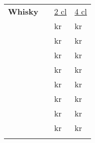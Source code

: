 \documentclass[12pt, twoside]{article}
\newcommand*\fontstyle[1]{%
  {\fontsize{15}{20}\sffamily{#1}}
}
\newcommand*\pricestyle[1]{%
  {\fontsize{14}{20}\normalfont#1}
}
\newcommand*\ColText[1]{\textcolor{Goldenrod3}{#1}}
\newenvironment{whiskySection}[1]
  {
    \pagebreak[3]\noindent\begin{longtable}{p{0.3cm}p{10cm}p{1.5cm}p{1.5cm}}
    {\endfirsthead\fontsize{30}{34}\bf\selectfont\ColText{#1}} && \pricestyle{\underline{2 cl}} & \pricestyle{\underline{4 cl}}
    \\[0.4cm]\nopagebreak
  }  
{\end{longtable}}
\newcommand*\spirit[3]{%
&\fontstyle{#1} & \pricestyle{#2 kr} & \pricestyle{#3 kr}\\ [1.7ex]\nopagebreak[4]%
}
\begin{document}
% 
%




\begin{whiskySection}{Whisky}

\spirit{Ardbeg Corryvreckan}{20}{40}


\spirit{Auchentoshan 12y}{15}{30}


\spirit{Jura Superstition}{20}{35}

\spirit{Lagavulin 16y}{20}{35}

\spirit{Laphroaig Quarter Cask}{15}{30}

\spirit{Laphroaig 18y}{20}{40}

\spirit{Oban}{15}{30}

\spirit{Talisker 10y}{15}{25}

\end{whiskySection}




\begin{comment}

\begin{whiskySection}{Rums}

\spirit{Ron Zacapa}{35 kr}


\spirit{The Kraken}{25 kr}


\end{whiskySection}

\end{comment}
\end{document}
